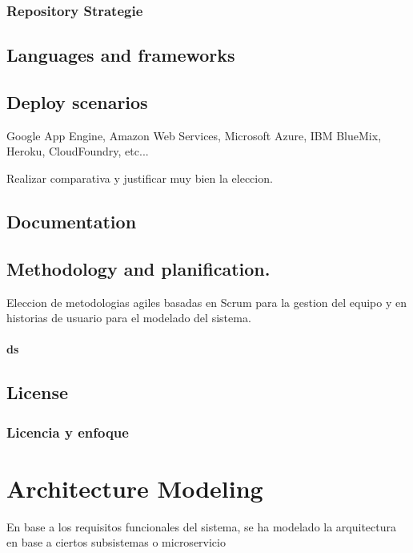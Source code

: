 \documentclass[oneside,english,titlepage]{scrbook}
\begin{document}
\subsection{Repository Strategie}

\section{Languages and frameworks}

\section{Deploy scenarios}

Google App Engine, Amazon Web Services, Microsoft Azure, IBM BlueMix,
Heroku, CloudFoundry, etc...

Realizar comparativa y justificar muy bien la eleccion.

\section{Documentation}

\section{Methodology and planification.}

Eleccion de metodologias agiles basadas en Scrum para la gestion del
equipo y en historias de usuario para el modelado del sistema.

\subsubsection {ds}

\section{License}

\subsection{Licencia y enfoque}

\chapter{Architecture Modeling}

En base a los requisitos funcionales del sistema, se ha modelado la
arquitectura en base a ciertos subsistemas o microservicio
\end{document}
